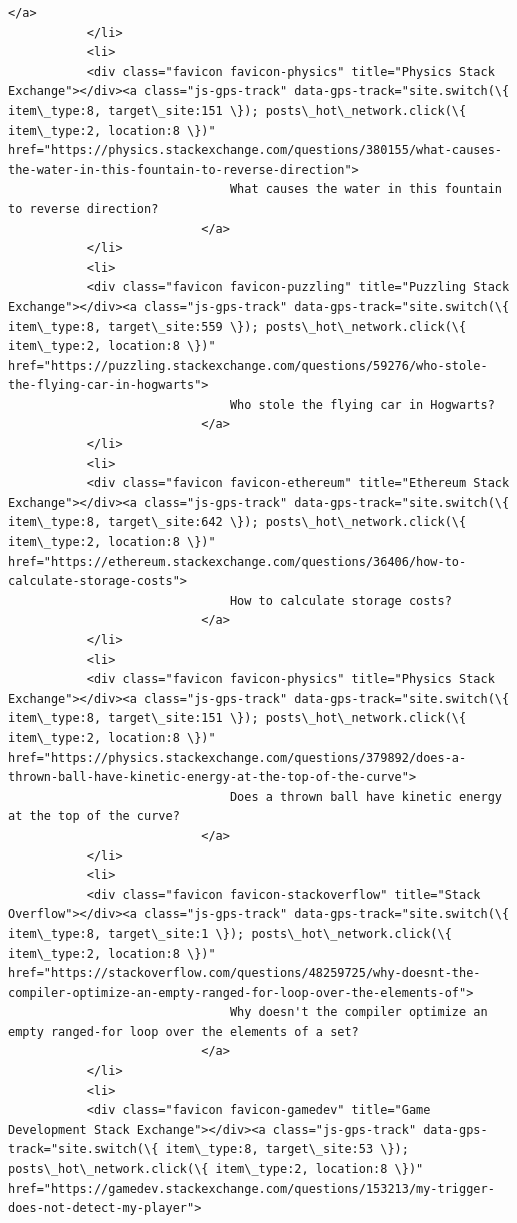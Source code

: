 \documentclass[11pt]{article}
\begin{document}
\begin{Verbatim}[commandchars=\\\{\}]
                           </a>
           </li>
           <li>
           <div class="favicon favicon-physics" title="Physics Stack Exchange"></div><a class="js-gps-track" data-gps-track="site.switch(\{ item\_type:8, target\_site:151 \}); posts\_hot\_network.click(\{ item\_type:2, location:8 \})" href="https://physics.stackexchange.com/questions/380155/what-causes-the-water-in-this-fountain-to-reverse-direction">
                               What causes the water in this fountain to reverse direction?
                           </a>
           </li>
           <li>
           <div class="favicon favicon-puzzling" title="Puzzling Stack Exchange"></div><a class="js-gps-track" data-gps-track="site.switch(\{ item\_type:8, target\_site:559 \}); posts\_hot\_network.click(\{ item\_type:2, location:8 \})" href="https://puzzling.stackexchange.com/questions/59276/who-stole-the-flying-car-in-hogwarts">
                               Who stole the flying car in Hogwarts?
                           </a>
           </li>
           <li>
           <div class="favicon favicon-ethereum" title="Ethereum Stack Exchange"></div><a class="js-gps-track" data-gps-track="site.switch(\{ item\_type:8, target\_site:642 \}); posts\_hot\_network.click(\{ item\_type:2, location:8 \})" href="https://ethereum.stackexchange.com/questions/36406/how-to-calculate-storage-costs">
                               How to calculate storage costs?
                           </a>
           </li>
           <li>
           <div class="favicon favicon-physics" title="Physics Stack Exchange"></div><a class="js-gps-track" data-gps-track="site.switch(\{ item\_type:8, target\_site:151 \}); posts\_hot\_network.click(\{ item\_type:2, location:8 \})" href="https://physics.stackexchange.com/questions/379892/does-a-thrown-ball-have-kinetic-energy-at-the-top-of-the-curve">
                               Does a thrown ball have kinetic energy at the top of the curve?
                           </a>
           </li>
           <li>
           <div class="favicon favicon-stackoverflow" title="Stack Overflow"></div><a class="js-gps-track" data-gps-track="site.switch(\{ item\_type:8, target\_site:1 \}); posts\_hot\_network.click(\{ item\_type:2, location:8 \})" href="https://stackoverflow.com/questions/48259725/why-doesnt-the-compiler-optimize-an-empty-ranged-for-loop-over-the-elements-of">
                               Why doesn't the compiler optimize an empty ranged-for loop over the elements of a set?
                           </a>
           </li>
           <li>
           <div class="favicon favicon-gamedev" title="Game Development Stack Exchange"></div><a class="js-gps-track" data-gps-track="site.switch(\{ item\_type:8, target\_site:53 \}); posts\_hot\_network.click(\{ item\_type:2, location:8 \})" href="https://gamedev.stackexchange.com/questions/153213/my-trigger-does-not-detect-my-player">

\end{Verbatim}
\end{document}
